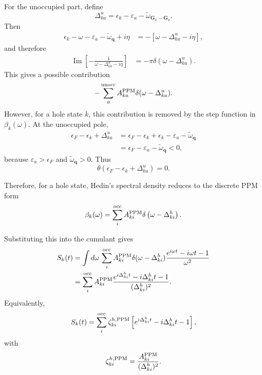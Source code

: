 For the unoccupied part, define
\begin{equation}
    \Delta_{ka}^{u}
    =
    \epsilon_k-\varepsilon_a-\widetilde{\omega}_{\bm G_k-\bm G_a}.
\end{equation}
Then
\begin{align}
\epsilon_k-\omega-\varepsilon_a-\widetilde{\omega}_{\bm q}+i\eta
&=
-\left[
\omega-\Delta_{ka}^{u}-i\eta
\right],
\end{align}
and therefore
\begin{align}
\operatorname{Im}
\left[
-\frac{1}{\omega-\Delta_{ka}^{u}-i\eta}
\right]
&=
-\pi\delta(\omega-\Delta_{ka}^{u}).
\end{align}
This gives a possible contribution
\begin{equation}
    -\sum_a^{\rm unocc}
    A_{ka}^{\rm PPM}
    \delta(\omega-\Delta_{ka}^{u}).
\end{equation}
However, for a hole state \(k\), this contribution is removed by the step function in
\(\beta_k(\omega)\). At the unoccupied pole,
\begin{align}
\epsilon_F-\epsilon_k+\Delta_{ka}^{u}
&=
\epsilon_F-\epsilon_k
+
\epsilon_k-\varepsilon_a-\widetilde{\omega}_{\bm q}
\\
&=
\epsilon_F-\varepsilon_a-\widetilde{\omega}_{\bm q}
<0,
\end{align}
because \(\varepsilon_a>\epsilon_F\) and
\(\widetilde{\omega}_{\bm q}>0\). Thus
\begin{equation}
    \theta(\epsilon_F-\epsilon_k+\Delta_{ka}^{u})=0.
\end{equation}

Therefore, for a hole state, Hedin's spectral density reduces to the discrete PPM form
\begin{equation}
    \beta_k(\omega)
    =
    \sum_i^{\rm occ}
    A_{ki}^{\rm PPM}
    \delta
    \left(
    \omega-\Delta_{ki}^{h}
    \right).
\end{equation}

Substituting this into the cumulant gives
\begin{align}
S_k(t)
&=
\int d\omega\,
\sum_i^{\rm occ}
A_{ki}^{\rm PPM}
\delta(\omega-\Delta_{ki}^{h})
\frac{e^{i\omega t}-i\omega t-1}{\omega^2}
\\
&=
\sum_i^{\rm occ}
A_{ki}^{\rm PPM}
\frac{
e^{i\Delta_{ki}^{h}t}
-i\Delta_{ki}^{h}t
-1
}
{
(\Delta_{ki}^{h})^2
}.
\end{align}
Equivalently,
\begin{equation}
    S_k(t)
    =
    \sum_i^{\rm occ}
    \zeta_{ki}^{h,{\rm PPM}}
    \left[
    e^{i\Delta_{ki}^{h}t}
    -i\Delta_{ki}^{h}t
    -1
    \right],
\end{equation}
with
\begin{equation}
    \zeta_{ki}^{h,{\rm PPM}}
    =
    \frac{A_{ki}^{\rm PPM}}
         {(\Delta_{ki}^{h})^2}.
\end{equation}

